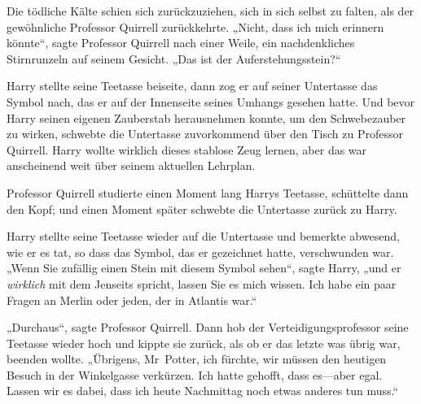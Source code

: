 Die tödliche Kälte schien sich zurückzuziehen, sich in sich selbst zu falten, als der gewöhnliche Professor Quirrell zurückkehrte. „Nicht, dass ich mich erinnern könnte“, sagte Professor Quirrell nach einer Weile, ein nachdenkliches Stirnrunzeln auf seinem Gesicht. „Das ist der Auferstehungsstein?“

Harry stellte seine Teetasse beiseite, dann zog er auf seiner Untertasse das Symbol nach, das er auf der Innenseite seines Umhangs gesehen hatte. Und bevor Harry seinen eigenen Zauberstab herausnehmen konnte, um den Schwebezauber zu wirken, schwebte die Untertasse zuvorkommend über den Tisch zu Professor Quirrell. Harry wollte wirklich dieses stablose Zeug lernen, aber das war anscheinend weit über seinem aktuellen Lehrplan.

Professor Quirrell studierte einen Moment lang Harrys Teetasse, schüttelte dann den Kopf; und einen Moment später schwebte die Untertasse zurück zu Harry.

Harry stellte seine Teetasse wieder auf die Untertasse und bemerkte abwesend, wie er es tat, so dass das Symbol, das er gezeichnet hatte, verschwunden war. „Wenn Sie zufällig einen Stein mit diesem Symbol sehen“, sagte Harry, „und er \emph{wirklich} mit dem Jenseits spricht, lassen Sie es mich wissen. Ich habe ein paar Fragen an Merlin oder jeden, der in Atlantis war.“

„Durchaus“, sagte Professor Quirrell. Dann hob der Verteidigungsprofessor seine Teetasse wieder hoch und kippte sie zurück, als ob er das letzte was übrig war, beenden wollte. „Übrigens, Mr~Potter, ich fürchte, wir müssen den heutigen Besuch in der Winkelgasse verkürzen. Ich hatte gehofft, dass es—aber egal. Lassen wir es dabei, dass ich heute Nachmittag noch etwas anderes tun muss.“

